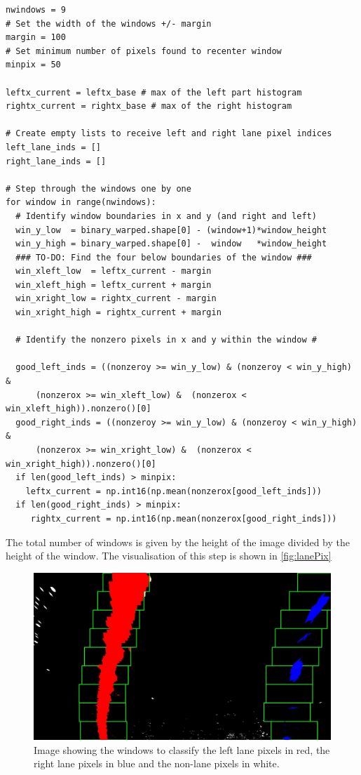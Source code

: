 \documentclass{article}
\begin{document}
\begin{lstlisting}
nwindows = 9
# Set the width of the windows +/- margin
margin = 100
# Set minimum number of pixels found to recenter window
minpix = 50

leftx_current = leftx_base # max of the left part histogram
rightx_current = rightx_base # max of the right histogram

# Create empty lists to receive left and right lane pixel indices
left_lane_inds = []
right_lane_inds = []

# Step through the windows one by one
for window in range(nwindows):
  # Identify window boundaries in x and y (and right and left)
  win_y_low  = binary_warped.shape[0] - (window+1)*window_height
  win_y_high = binary_warped.shape[0] -  window   *window_height
  ### TO-DO: Find the four below boundaries of the window ###
  win_xleft_low  = leftx_current - margin 
  win_xleft_high = leftx_current + margin  
  win_xright_low = rightx_current - margin
  win_xright_high = rightx_current + margin 
  
  # Identify the nonzero pixels in x and y within the window #

  good_left_inds = ((nonzeroy >= win_y_low) & (nonzeroy < win_y_high) & 
      (nonzerox >= win_xleft_low) &  (nonzerox < win_xleft_high)).nonzero()[0]
  good_right_inds = ((nonzeroy >= win_y_low) & (nonzeroy < win_y_high) & 
      (nonzerox >= win_xright_low) &  (nonzerox < win_xright_high)).nonzero()[0]
  if len(good_left_inds) > minpix:
    leftx_current = np.int16(np.mean(nonzerox[good_left_inds]))
  if len(good_right_inds) > minpix:        
     rightx_current = np.int16(np.mean(nonzerox[good_right_inds]))
\end{lstlisting}


The total number of windows is given by the height of the image divided by the height of the window. The visualisation of this step is shown in \autoref{fig:lanePix}
\begin{figure}
\centering
\includegraphics[scale=0.25]{output_images/test1/9_windowed}
\caption{Image showing the windows to classify the left lane pixels in red, the right lane pixels in blue and the non-lane pixels in white.}
\label{fig:lanePix}
\end{figure}
\end{document}
